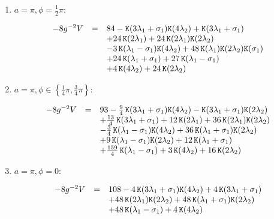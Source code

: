 \documentclass[a4paper,12pt]{article}
\begin{document}
\begin{enumerate}


\item $a=\pi, \phi=\frac{1}{2}\pi$:

\begin{equation}
\begin{array}{lll}
-8g^{-2}V&=&84 -{\tt K}{\left(3 \lambda_1+ \sigma_1\right)} {\tt K}{\left(4 \lambda_2\right)}
+{\tt K}{\left(3 \lambda_1+ \sigma_1\right)}\\
&&+24\,{\tt K}{\left(2 \lambda_1\right)}
+24\,{\tt K}{\left(2 \lambda_1\right)} {\tt K}{\left(2 \lambda_2\right)}\\
&&-3\,{\tt K}{\left( \lambda_1-\sigma_1\right)} {\tt K}{\left(4 \lambda_2\right)}
+48\,{\tt K}{\left( \lambda_1\right)} {\tt K}{\left(2 \lambda_2\right)} {\tt K}{\left( \sigma_1\right)}\\
&&+24\,{\tt K}{\left( \lambda_1+ \sigma_1\right)}
+27\,{\tt K}{\left( \lambda_1- \sigma_1\right)}\\
&&+4\,{\tt K}{\left(4 \lambda_2\right)}
+24\,{\tt K}{\left(2 \lambda_2\right)}
\end{array}
\end{equation}


\item $a=\pi, \phi\in\left\{\frac{1}{4}\pi, \frac{3}{4}\pi\right\}$:

\begin{equation}
\begin{array}{lll}
-8g^{-2}V&=&93
-\frac{9}{4}\,{\tt K}{\left(3 \lambda_1+ \sigma_1\right)} {\tt K}{\left(4 \lambda_2\right)}
-{\tt K}{\left(3 \lambda_1 +  \sigma_1\right)} {\tt K}{\left(2 \lambda_2\right)}\\
&&+\frac{13}{4}\,{\tt K}{\left(3 \lambda_1+ \sigma_1\right)}
+12\,{\tt K}{\left(2 \lambda_1\right)}
+36\,{\tt K}{\left(2 \lambda_1\right)} {\tt K}{\left(2 \lambda_2\right)}\\
&&-\frac{3}{4}\,{\tt K}{\left( \lambda_1- \sigma_1\right)} {\tt K}{\left(4 \lambda_2\right)}
+36\,{\tt K}{\left( \lambda_1+ \sigma_1\right)} {\tt K}{\left(2 \lambda_2\right)}\\
&&+9\,{\tt K}{\left( \lambda_1- \sigma_1\right)} {\tt K}{\left(2 \lambda_2\right)}
+12\,{\tt K}{\left( \lambda_1 + \sigma_1\right)}\\
&&+\frac{159}{4}\,{\tt K}{\left( \lambda_1- \sigma_1\right)}
+3\,{\tt K}{\left(4 \lambda_2\right)}
+16\,{\tt K}{\left(2 \lambda_2\right)}
\end{array}
\end{equation}


\item $a=\pi, \phi=0$:

\begin{equation}
\begin{array}{lll}
-8g^{-2}V&=&108
-4\,{\tt K}{\left(3 \lambda_1+ \sigma_1\right)} {\tt K}{\left(4 \lambda_2\right)}
+4\,{\tt K}{\left(3 \lambda_1+ \sigma_1\right)}\\
&&+48\,{\tt K}{\left(2 \lambda_1\right)} {\tt K}{\left(2 \lambda_2\right)}
+48\,{\tt K}{\left( \lambda_1+ \sigma_1\right)} {\tt K}{\left(2 \lambda_2\right)}\\
&&+48\,{\tt K}{\left( \lambda_1- \sigma_1\right)}
+4\,{\tt K}{\left(4 \lambda_2\right)}
\end{array}
\end{equation}


\end{enumerate}
\end{document}
